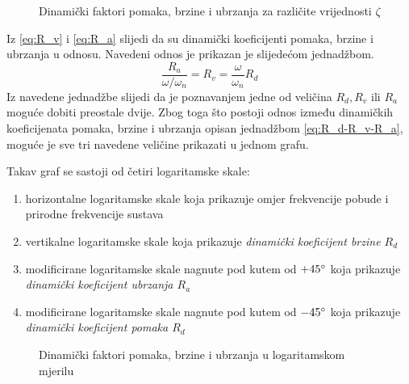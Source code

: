 \begin{figure}[H]
    
    \caption{Dinamički faktori pomaka, brzine i ubrzanja za različite vrijednosti
    $\zeta$}
    \label{fig:rd-rv-ra}
\end{figure}


Iz \eqref{eq:R_v} i \eqref{eq:R_a} slijedi da su dinamički koeficijenti pomaka,
brzine i ubrzanja u odnosu. Navedeni odnos je prikazan je slijedećom jednadžbom.
\begin{equation}\label{eq:R_d-R_v-R_a}
    \frac{R_a}{\omega/\omega_n}=R_v=\frac{\omega}{\omega_n}R_d 
\end{equation}
Iz navedene jednadžbe slijedi da je poznavanjem jedne od veličina $R_d, R_v 
\text{ ili } R_a$ moguće dobiti preostale dvije. Zbog toga što postoji odnos
između dinamičkih koeficijenata pomaka, brzine i ubrzanja opisan jednadžbom 
\eqref{eq:R_d-R_v-R_a}, moguće je sve tri navedene veličine prikazati u jednom
grafu.

Takav graf se sastoji od četiri logaritamske skale:
\begin{enumerate}
    \item horizontalne logaritamske skale koja prikazuje omjer frekvencije pobude i 
        prirodne frekvencije sustava 
    \item vertikalne logaritamske skale koja prikazuje \textit{dinamički koeficijent brzine
        $R_d$}
    \item modificirane logaritamske skale nagnute pod kutem od $+45\degree$ koja prikazuje
        \textit{dinamički koeficijent ubrzanja $R_a$}
    \item modificirane logaritamske skale nagnute pod kutem od $-45\degree$ koja prikazuje
        \textit{dinamički koeficijent pomaka $R_d$}
\end{enumerate}

\begin{figure}[H]
    
    \label{fig:dva-spektar}
    \caption{Dinamički faktori pomaka, brzine i ubrzanja u logaritamskom mjerilu}
\end{figure}

